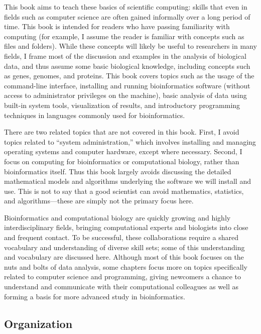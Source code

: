 \documentclass[
]{memoir}
\begin{document}
This book aims to teach these basics of scientific computing: skills that even in fields such as computer science are often gained informally over a long period of time. This book is intended for readers who have passing familiarity with computing (for example, I assume the reader is familiar with concepts such as files and folders). While these concepts will likely be useful to researchers in many fields, I frame most of the discussion and examples in the analysis of biological data, and thus assume some basic biological knowledge, including concepts such as genes, genomes, and proteins. This book covers topics such as the usage of the command-line interface, installing and running bioinformatics software (without access to administrator privileges on the machine), basic analysis of data using built-in system tools, visualization of results, and introductory programming techniques in languages commonly used for bioinformatics.

There are two related topics that are not covered in this book. First, I avoid topics related to \enquote{system administration,} which involves installing and managing operating systems and computer hardware, except where necessary. Second, I focus on computing for bioinformatics or computational biology, rather than bioinformatics itself. Thus this book largely avoids discussing the detailed mathematical models and algorithms underlying the software we will install and use. This is not to say that a good scientist can avoid mathematics, statistics, and algorithms---these are simply not the primary focus here.

Bioinformatics and computational biology are quickly growing and highly interdisciplinary fields, bringing computational experts and biologists into close and frequent contact. To be successful, these collaborations require a shared vocabulary and understanding of diverse skill sets; some of this understanding and vocabulary are discussed here. Although most of this book focuses on the nuts and bolts of data analysis, some chapters focus more on topics specifically related to computer science and programming, giving newcomers a chance to understand and communicate with their computational colleagues as well as forming a basis for more advanced study in bioinformatics.

\hypertarget{organization}{%
\subsection*{Organization}\label{organization}}
\end{document}
